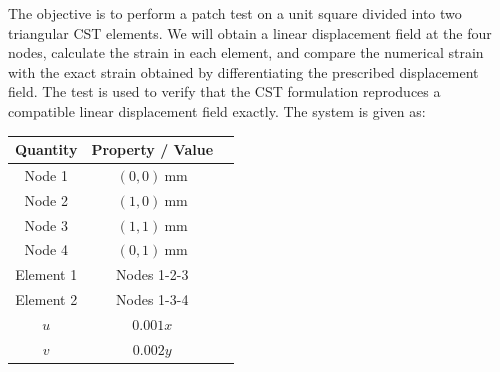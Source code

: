 The objective is to perform a patch test on a unit square divided into two triangular CST
elements. We will obtain a linear displacement field at the four nodes, calculate
the strain in each element, and compare the numerical strain with the exact
strain obtained by differentiating the prescribed displacement field. The
test is used to verify that the CST formulation reproduces a compatible
linear displacement field exactly. The system is given as:
\begin{table}[h!]
\centering
\begin{tabular}{ccl}
\toprule
\textbf{Quantity} & \textbf{Property / Value}\\
\midrule
Node 1 & $(0,0)\ \si{\milli\metre}$ \\
Node 2 & $(1,0)\ \si{\milli\metre}$ \\
Node 3 & $(1,1)\ \si{\milli\metre}$ \\
Node 4 & $(0,1)\ \si{\milli\metre}$ \\
Element 1 & Nodes 1-2-3\\
Element 2 & Nodes 1-3-4\\
$u$ & $0.001x$\\
$v$ & $0.002y$\\
\bottomrule
\end{tabular}
\end{table}

